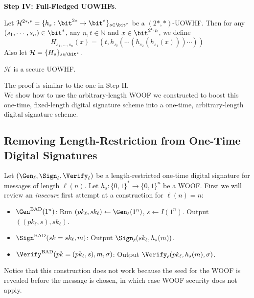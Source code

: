 \noindent\textbf{Step IV: Full-Fledged UOWHFs}. 
\begin{construction}[(a UOWHF)]
Let $\mathcal{H}^{2*, *} = \{h_s:\bit^{2*}\rightarrow\bit^{*}\}_{s\in\bit^{*}}$ be a $(2*, *)$-UOWHF. Then for any $(s_1,\cdots,s_n) \in \bit^*$, any $n, t\in\mathbb{N}$ and $x\in\bit^{2^t\cdot n}$, we define
\[
    H_{s_1,\dots,s_n}(x)=(t,h_{s_t}(\cdots(h_{s_2}(h_{s_1}(x)))\cdots))
\]
Also let $\mathcal{H} = \{H_s\}_{s \in \bit^*}$.
\end{construction}
\begin{claim}
    $\mathcal{H}$ is a secure UOWHF.
\end{claim}
The proof is similar to the one in Step II.\\

We show how to use the arbitrary-length WOOF we constructed to boost this one-time, fixed-length digital signature scheme into a one-time, arbitrary-length digital signature scheme. 

\subsection{Removing Length-Restriction from One-Time Digital Signatures} 

Let $(\Gen_\ell, \Sign_\ell, \Verify_\ell)$ be a length-restricted one-time digital signature for messages of length $\ell(n)$. 
Let $h_s: \{0,1\}^* \to \{0,1\}^n$ be a WOOF. 
First we will review an \emph{insecure} first attempt at a construction for $\ell(n) = n$: 
\begin{itemize}
    \item $\Gen^{\text{BAD}}(1^n)$: Run $(pk_\ell, sk_\ell) \leftarrow \Gen_\ell(1^n)$, $s \leftarrow I(1^n)$. Output $((pk_\ell,s),sk_\ell)$.

    \item $\Sign^{\text{BAD}}(sk=sk_\ell, m)$: Output $\Sign_\ell(sk_\ell, h_s(m))$. 

    \item $\Verify^{\text{BAD}}(pk=(pk_\ell,s), m, \sigma)$: Output $\Verify_\ell(pk_\ell, h_s(m), \sigma)$. 
\end{itemize}
Notice that this construction does not work because the seed for the WOOF is revealed before the message is chosen, in which case WOOF security does not apply. 

